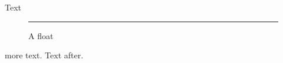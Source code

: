 \documentclass{article}
\begin{document}
Text \begin{figure}[htbp]\centering\rule{1cm}{100pt}\caption{A float}\end{figure}
more text.\pagebreak
Text after.
\gdef\SatexReachedEnd{}
\end{document}
